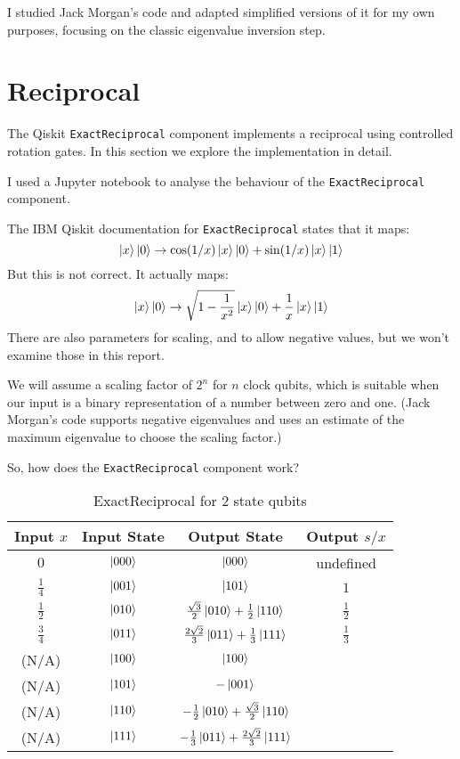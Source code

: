 \documentclass[12pt]{extarticle}
\begin{document}
I studied Jack Morgan's code and adapted simplified versions of it for my own purposes, focusing on the classic eigenvalue inversion step.

\section{Reciprocal}\label{sec:reciprocal}

The Qiskit \texttt{ExactReciprocal} component \cite{ibm_exact_reciprocal} implements a reciprocal using controlled rotation gates.
In this section we explore the implementation in detail.

I used a Jupyter notebook \cite{github_project_exactreciprocal} to analyse the behaviour of the \texttt{ExactReciprocal} component.

The IBM Qiskit documentation for \texttt{ExactReciprocal} states that it maps:
\[
\ket{x}\ket{0} \rightarrow \cos(1/x)\ket{x}\ket{0} + \sin(1/x)\ket{x}\ket{1}
\]
But this is not correct. It actually maps:
\[
\ket{x}\ket{0} \rightarrow \sqrt{1-\frac{1}{x^2}}\ket{x}\ket{0} + \frac{1}{x}\ket{x}\ket{1}
\]
There are also parameters for scaling, and to allow negative values, but we won't examine those in this report.

We will assume a scaling factor of $2^n$ for $n$ clock qubits, which is suitable when our input is a binary representation of a number between zero and one.
(Jack Morgan's code supports negative eigenvalues and uses an estimate of the maximum eigenvalue to choose the scaling factor.)

So, how does the \texttt{ExactReciprocal} component work?

\begin{table}[h!]
\centering
\begin{tabular}{|c|c|c|c|}
\hline
Input $x$     & Input State  & Output State                                              & Output $s/x$  \\
\hline
$0$           &  $\ket{000}$ &  $\ket{000}$                                              & undefined     \\
$\frac{1}{4}$ &  $\ket{001}$ &  $\ket{101}$                                              & $1$           \\
$\frac{1}{2}$ &  $\ket{010}$ & $\frac{\sqrt{3}}{2} \ket{010} + \frac{1}{2} \ket{110}$    & $\frac{1}{2}$ \\
$\frac{3}{4}$ &  $\ket{011}$ & $\frac{2 \sqrt{2}}{3} \ket{011} + \frac{1}{3} \ket{111}$  & $\frac{1}{3}$ \\
(N/A)         &  $\ket{100}$ & $\ket{100}$                                               & \\
(N/A)         &  $\ket{101}$ & $-\ket{001}$                                              & \\
(N/A)         &  $\ket{110}$ & $-\frac{1}{2} \ket{010} + \frac{\sqrt{3}}{2} \ket{110}$   & \\
(N/A)         &  $\ket{111}$ & $-\frac{1}{3} \ket{011} + \frac{2 \sqrt{2}}{3} \ket{111}$ & \\
\hline
\end{tabular}
\caption{ExactReciprocal for 2 state qubits}
\label{tab:exactreciprocal2}
\end{table}
\end{document}
